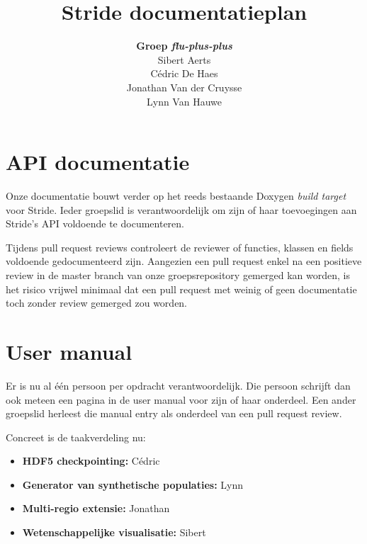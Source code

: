 \documentclass[10pt,a4paper]{article}
\author{\textbf{Groep \emph{flu-plus-plus}} \\ Sibert Aerts \\ Cédric De Haes \\ Jonathan Van der Cruysse \\ Lynn Van Hauwe}
\title{Stride documentatieplan}
\begin{document}
	
	\newcommand{\titleitem}[1]{\item \textbf{#1}}

	\maketitle
	
	\section{API documentatie}
	
	Onze documentatie bouwt verder op het reeds bestaande Doxygen \emph{build target} voor Stride. Ieder groepslid is verantwoordelijk om zijn of haar toevoegingen aan Stride's API voldoende te documenteren.
	
	Tijdens pull request reviews controleert de reviewer of functies, klassen en fields voldoende gedocumenteerd zijn. Aangezien een pull request enkel na een positieve review in de master branch van onze groepsrepository gemerged kan worden, is het risico vrijwel minimaal dat een pull request met weinig of geen documentatie toch zonder review gemerged zou worden.
	
	\section{User manual}
	
	Er is nu al \'e\'en persoon per opdracht verantwoordelijk. Die persoon schrijft dan ook meteen een pagina in de user manual voor zijn of haar onderdeel. Een ander groepslid herleest die manual entry als onderdeel van een pull request review.
	
	Concreet is de taakverdeling nu:
	
	\begin{itemize}
		\titleitem{HDF5 checkpointing:} Cédric
		\titleitem{Generator van synthetische populaties:} Lynn
		\titleitem{Multi-regio extensie:} Jonathan
		\titleitem{Wetenschappelijke visualisatie:} Sibert
	\end{itemize}
\end{document}
